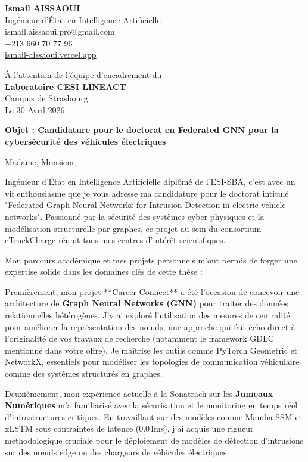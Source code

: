 \documentclass[a4paper,12pt]{article}
\begin{document}
\begin{flushleft}
    \textbf{Ismail AISSAOUI} \\
    Ingénieur d'État en Intelligence Artificielle \\
    ismail.aissaoui.pro@gmail.com \\
    +213 660 70 77 96 \\
    \href{https://ismail-aissaoui.vercel.app}{ismail-aissaoui.vercel.app}
\end{flushleft}

\begin{flushright}
    À l'attention de l'équipe d'encadrement du \\
    \textbf{Laboratoire CESI LINEACT} \\
    Campus de Strasbourg \\
    \medskip
    Le 30 Avril 2026
\end{flushright}

\bigskip

\noindent \textbf{Objet : Candidature pour le doctorat en Federated GNN pour la cybersécurité des véhicules électriques}

\bigskip

Madame, Monsieur,

Ingénieur d'État en Intelligence Artificielle diplômé de l'ESI-SBA, c'est avec un vif enthousiasme que je vous adresse ma candidature pour le doctorat intitulé "Federated Graph Neural Networks for Intrusion Detection in electric vehicle networks". Passionné par la sécurité des systèmes cyber-physiques et la modélisation structurelle par graphes, ce projet au sein du consortium eTruckCharge réunit tous mes centres d'intérêt scientifiques.

Mon parcours académique et mes projets personnels m'ont permis de forger une expertise solide dans les domaines clés de cette thèse :

Premièrement, mon projet **Career Connect** a été l'occasion de concevoir une architecture de \textbf{Graph Neural Networks (GNN)} pour traiter des données relationnelles hétérogènes. J'y ai exploré l'utilisation des mesures de centralité pour améliorer la représentation des nœuds, une approche qui fait écho direct à l'originalité de vos travaux de recherche (notamment le framework GDLC mentionné dans votre offre). Je maîtrise les outils comme PyTorch Geometric et NetworkX, essentiels pour modéliser les topologies de communication véhiculaire comme des systèmes structurés en graphes.

Deuxièmement, mon expérience actuelle à la Sonatrach sur les \textbf{Jumeaux Numériques} m'a familiarisé avec la sécurisation et le monitoring en temps réel d'infrastructures critiques. En travaillant sur des modèles comme Mamba-SSM et xLSTM sous contraintes de latence (0.04ms), j'ai acquis une rigueur méthodologique cruciale pour le déploiement de modèles de détection d'intrusions sur des nœuds edge ou des chargeurs de véhicules électriques.
\end{document}
